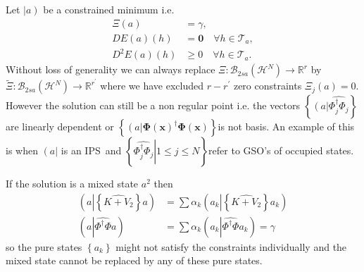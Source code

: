 \documentclass[aps,preprint]{revtex4}%
\begin{document}
Let $\left\vert \overset{}{a}\right)  $ be a constrained minimum i.e.
\begin{align}
\Xi\left(  a\right)   &  =\gamma,\nonumber\\
DE\left(  a\right)  \left(  h\right)   &  =\mathbf{0}\quad\forall
h\in\mathcal{T}_{a},\nonumber\\
D^{2}E\left(  a\right)  \left(  h\right)   &  \geq0\quad\forall h\in
\mathcal{T}_{a}.
\end{align}
Without loss of generality we can always replace $\Xi:\mathcal{B}_{2sa}\left(
\mathcal{H}^{N}\right)  \rightarrow\mathbb{R}^{r}$ by $\tilde{\Xi}%
:\mathcal{B}_{2sa}\left(  \mathcal{H}^{N}\right)  \rightarrow\mathbb{R}%
^{r^{\prime}}$ where we have excluded $r-r^{\prime}$ zero constraints $\Xi
_{j}\left(  a\right)  =0.$ However the solution can still be a non regular
point i.e. the vectors $\left\{  \left(  \overset{}{a}\right\vert
\widehat{\Phi_{j}^{\dagger}\Phi_{j}}\right\}  $ are linearly dependent or
$\left\{  \left(  \overset{}{a}\right\vert \mathbf{\Phi}\left(  \mathbf{x}%
\right)  ^{\dagger}\mathbf{\Phi}\left(  \mathbf{x}\right)  \right\}  $is not
basis. An example of this is when $\left(  a\right\vert $ is an IPS\ and
$\left\{  \left.  \widehat{\Phi_{j}^{\dagger}\Phi_{j}}\right\vert 1\leq j\leq
N\right\}  $refer to GSO's of occupied states.

If the solution is a mixed state $a^{2}$ then
\begin{align}
\left(  a\left\vert \left\{  \widehat{K+V_{2}}\right\}  \right.  a\right)   &
=\sum\alpha_{k}\left(  a_{k}\left\vert \left\{  \widehat{K+V_{2}}\right\}
\right.  a_{k}\right) \nonumber\\
\left(  a\left\vert \widehat{\Phi^{\dagger}\Phi}\right.  a\right)   &
=\sum\alpha_{k}\left(  a_{k}\left\vert \widehat{\Phi^{\dagger}\Phi}\right.
a_{k}\right)  =\gamma
\end{align}
so the pure states $\left\{  a_{k}\right\}  $ might not satisfy the
constraints individually and the mixed state cannot be replaced by any of
these pure states.
\end{document}

